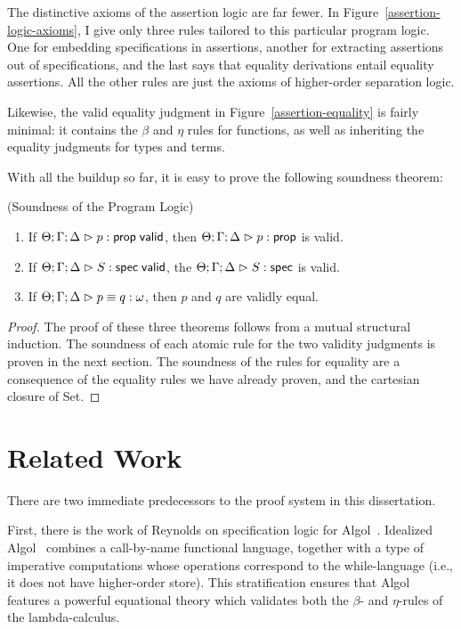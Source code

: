 The distinctive axioms of the assertion logic are far fewer. In
Figure~\ref{assertion-logic-axioms}, I give only three rules tailored
to this particular program logic. One for embedding specifications in
assertions, another for extracting assertions out of specifications,
and the last says that equality derivations entail equality
assertions. All the other rules are just the axioms of higher-order
separation logic.

Likewise, the valid equality judgment in
Figure~\ref{assertion-equality} is fairly minimal: it contains the
$\beta$ and $\eta$ rules for functions, as well as inheriting the
equality judgments for types and terms.

With all the buildup so far, it is easy to prove the following soundness
theorem:

\begin{theorem}{(Soundness of the Program Logic)}
  \begin{enumerate}
  \item If ${\Theta; \Gamma; \Delta} \vartriangleright {p} : \mathsf{prop} \;\mathsf{valid}$, then ${\Theta; \Gamma; \Delta} \vartriangleright {p} : {\mathsf{prop}}$ is valid.

  \item If ${\Theta; \Gamma; \Delta} \vartriangleright {S} : \mathsf{spec} \;\mathsf{valid}$, the ${\Theta; \Gamma; \Delta} \vartriangleright {S} : \mathsf{spec}$ is valid.

  \item If ${\Theta; \Gamma; \Delta} \vartriangleright {p} \equiv {q} : {\omega}$, then $p$ and $q$ are validly equal.
  \end{enumerate}
\end{theorem}

\begin{proof}
  The proof of these three theorems follows from a mutual structural
  induction.  The soundness of each atomic rule for the two validity
  judgments is proven in the next section. The soundness of the rules
  for equality are a consequence of the equality rules we have already
  proven, and the cartesian closure of Set.  
\end{proof}

\section{Related Work}

There are two immediate predecessors to the proof system in this
dissertation. 

First, there is the work of Reynolds on specification logic for
Algol~\cite{spec-logic}. Idealized Algol~\cite{idealized-algol}
combines a call-by-name functional language, together with a type of
imperative computations whose operations correspond to the
while-language (i.e., it does not have higher-order store). This
stratification ensures that Algol features a powerful equational
theory which validates both the $\beta$- and $\eta$-rules of the
lambda-calculus. 

